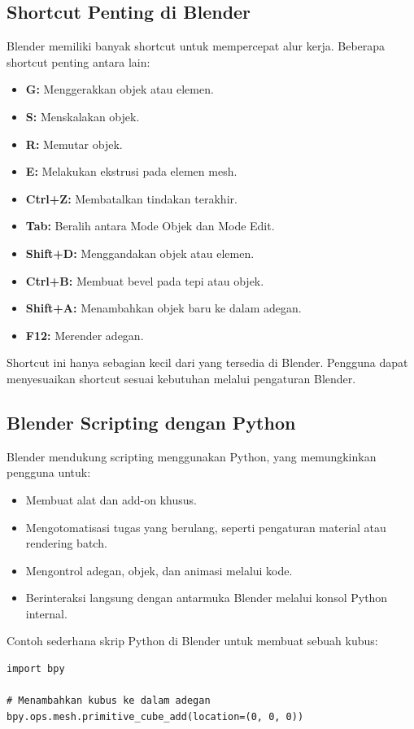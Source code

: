 \subsection{Shortcut Penting di Blender}
Blender memiliki banyak shortcut untuk mempercepat alur kerja. Beberapa shortcut penting antara lain:
\begin{itemize}
    \item \textbf{G:} Menggerakkan objek atau elemen.
    \item \textbf{S:} Menskalakan objek.
    \item \textbf{R:} Memutar objek.
    \item \textbf{E:} Melakukan ekstrusi pada elemen mesh.
    \item \textbf{Ctrl+Z:} Membatalkan tindakan terakhir.
    \item \textbf{Tab:} Beralih antara Mode Objek dan Mode Edit.
    \item \textbf{Shift+D:} Menggandakan objek atau elemen.
    \item \textbf{Ctrl+B:} Membuat bevel pada tepi atau objek.
    \item \textbf{Shift+A:} Menambahkan objek baru ke dalam adegan.
    \item \textbf{F12:} Merender adegan.
\end{itemize}

Shortcut ini hanya sebagian kecil dari yang tersedia di Blender. Pengguna dapat menyesuaikan shortcut sesuai kebutuhan melalui pengaturan Blender.

\subsection{Blender Scripting dengan Python}
Blender mendukung scripting menggunakan Python, yang memungkinkan pengguna untuk:
\begin{itemize}
    \item Membuat alat dan add-on khusus.
    \item Mengotomatisasi tugas yang berulang, seperti pengaturan material atau rendering batch.
    \item Mengontrol adegan, objek, dan animasi melalui kode.
    \item Berinteraksi langsung dengan antarmuka Blender melalui konsol Python internal.
\end{itemize}

Contoh sederhana skrip Python di Blender untuk membuat sebuah kubus:
\begin{verbatim}
import bpy

# Menambahkan kubus ke dalam adegan
bpy.ops.mesh.primitive_cube_add(location=(0, 0, 0))
\end{verbatim}

